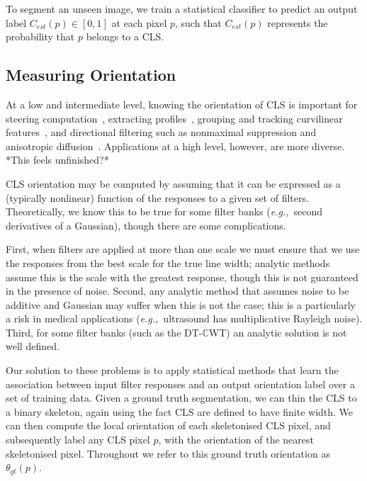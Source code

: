 \documentclass{IEEEtran}
\def\eg{\emph{e.g.,}}
\def\dtcwt{DT-$\mathbb{C}$WT}
\begin{document}
To segment an unseen image, we train a statistical classifier to predict an output label $C_{est}(p) \in [0, 1]$ at each pixel $p$, such that $C_{est}(p)$ represents the probability that $p$ belongs to a CLS.


\subsection{Measuring Orientation}
\label{s:measuring_orientation}
At a low and intermediate level, knowing the orientation of CLS is important for steering computation~\cite{Sonka_99}, extracting profiles~\cite{Zwiggelaar_etal_TMI04,Staal_etal_TMI04}, grouping and tracking curvilinear features~\cite{Aylward_Bullitt_TMI02}, and directional filtering such as nonmaximal suppression and anisotropic diffusion~\cite{Perona_PAMI90}. Applications at a high level, however, are more diverse. *This feels unfinished?*

CLS orientation may be computed by assuming that it can be expressed as a (typically nonlinear) function of the responses to a given set of filters. Theoretically, we know this to be true for some filter banks (\eg~second derivatives of a Gaussian), though there are some complications.

First, when filters are applied at more than one scale we must ensure that we use the responses from the best scale for the true line width; analytic methods~\cite{Karssemeijer_teBrake_TMI96,Mei_etal_IVC09} assume this is the scale with the greatest response, though this is not guaranteed in the presence of noise. Second, any analytic method that assumes noise to be additive and Gaussian may suffer when this is not the case; this is a particularly a risk in medical applications (\eg~ultrasound has multiplicative Rayleigh noise). Third, for some filter banks (such as the \dtcwt{}) an analytic solution is not well defined.

Our solution to these problems is to apply statistical methods that learn the association between input filter responses and an output orientation label over a set of training data. Given a ground truth segmentation, we can thin the CLS to a binary skeleton, again using the fact CLS are defined to have finite width. We can then compute the local orientation of each skeletonised CLS pixel, and subsequently label any CLS pixel $p$, with the orientation of the nearest skeletonised pixel. Throughout we refer to this ground truth orientation as $\theta_{gt}(p)$.
\end{document}
